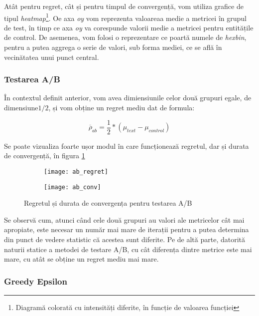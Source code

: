 Atât pentru regret, cât și pentru timpul de convergență, vom utiliza grafice de tipul \textit{heatmap}\footnote{Diagramă colorată cu intensități diferite, în funcție de valoarea funcției}. Oe axa \textit{oy} vom reprezenta valoareaa medie a metricei în grupul de test, în timp ce axa \textit{oy} va corespunde valorii medie a metricei pentru entitățile de control. De asemenea, vom folosi o reprezentare ce poartă numele de \textit{hexbin}, pentru a putea aggrega o serie de valori, sub forma mediei, ce se află în vecinătatea unui punct central.

\subsubsection{Testarea A/B}

În contextul definit anterior, vom avea dimiensiunile celor două grupuri egale, de dimensiune$1/2$, și vom obține un regret mediu dat de formula:

\[
	\overline{\rho}_{ab} = \frac{1}{2} * (\mu_{text} - \mu_{control})
\]
	
Se poate vizualiza foarte ușor modul în care funcționează regretul, dar și durata de convergență, în figura \ref{fig:ab_evaluation}

\begin{figure}[H]
	\centering
	\begin{subfigure}{.5\textwidth}
		\centering
		\texttt{[image: ab\_regret]}
	\end{subfigure}%
	\begin{subfigure}{.5\textwidth}
		\centering
		\texttt{[image: ab\_conv]}
	\end{subfigure}
	\caption{Regretul și durata de convergența pentru testarea A/B\\}
	\label{fig:ab_evaluation}
\end{figure}

Se observă cum, atunci când cele două grupuri au valori ale metricelor cât mai apropiate, este necesar un număr mai mare de iterații pentru a putea determina din punct de vedere statistic că acestea sunt diferite. Pe de altă parte, datorită naturii statice a metodei de testare A/B, cu cât diferența dintre metrice este mai mare, cu atât se obține un regret mediu mai mare.

\subsubsection{Greedy Epsilon}

